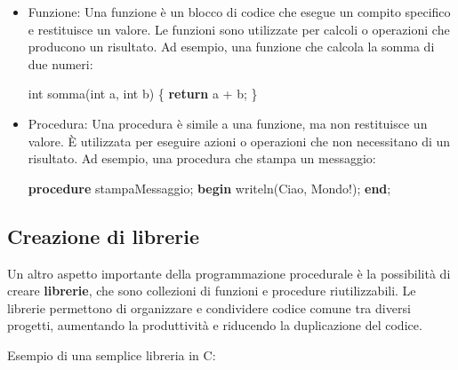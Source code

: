 \documentclass[
  letterpaper,
]{scrbook}
\newenvironment{Shaded}{\begin{snugshade}}{\end{snugshade}}
\newcommand{\ControlFlowTok}[1]{\textcolor[rgb]{0.00,0.23,0.31}{\textbf{#1}}}
\newcommand{\DataTypeTok}[1]{\textcolor[rgb]{0.68,0.00,0.00}{#1}}
\newcommand{\KeywordTok}[1]{\textcolor[rgb]{0.00,0.23,0.31}{\textbf{#1}}}
\newcommand{\NormalTok}[1]{\textcolor[rgb]{0.00,0.23,0.31}{#1}}
\newcommand{\OperatorTok}[1]{\textcolor[rgb]{0.37,0.37,0.37}{#1}}
\newcommand{\StringTok}[1]{\textcolor[rgb]{0.13,0.47,0.30}{#1}}
\begin{document}
\begin{itemize}
\item
  Funzione: Una funzione è un blocco di codice che esegue un compito
  specifico e restituisce un valore. Le funzioni sono utilizzate per
  calcoli o operazioni che producono un risultato. Ad esempio, una
  funzione che calcola la somma di due numeri:

\begin{Shaded}
\begin{Highlighting}[]
\DataTypeTok{int}\NormalTok{ somma}\OperatorTok{(}\DataTypeTok{int}\NormalTok{ a}\OperatorTok{,} \DataTypeTok{int}\NormalTok{ b}\OperatorTok{)} \OperatorTok{\{}
    \ControlFlowTok{return}\NormalTok{ a }\OperatorTok{+}\NormalTok{ b}\OperatorTok{;}
\OperatorTok{\}}
\end{Highlighting}
\end{Shaded}
\item
  Procedura: Una procedura è simile a una funzione, ma non restituisce
  un valore. È utilizzata per eseguire azioni o operazioni che non
  necessitano di un risultato. Ad esempio, una procedura che stampa un
  messaggio:

\begin{Shaded}
\begin{Highlighting}[]
\KeywordTok{procedure}\NormalTok{ stampaMessaggio;}
\KeywordTok{begin}
\NormalTok{    writeln(}\StringTok{\textquotesingle{}Ciao, Mondo!\textquotesingle{}}\NormalTok{);}
\KeywordTok{end}\NormalTok{;}
\end{Highlighting}
\end{Shaded}
\end{itemize}

\subsection{Creazione di librerie}\label{creazione-di-librerie}

Un altro aspetto importante della programmazione procedurale è la
possibilità di creare \textbf{librerie}, che sono collezioni di funzioni
e procedure riutilizzabili. Le librerie permettono di organizzare e
condividere codice comune tra diversi progetti, aumentando la
produttività e riducendo la duplicazione del codice.

Esempio di una semplice libreria in C:
\end{document}
